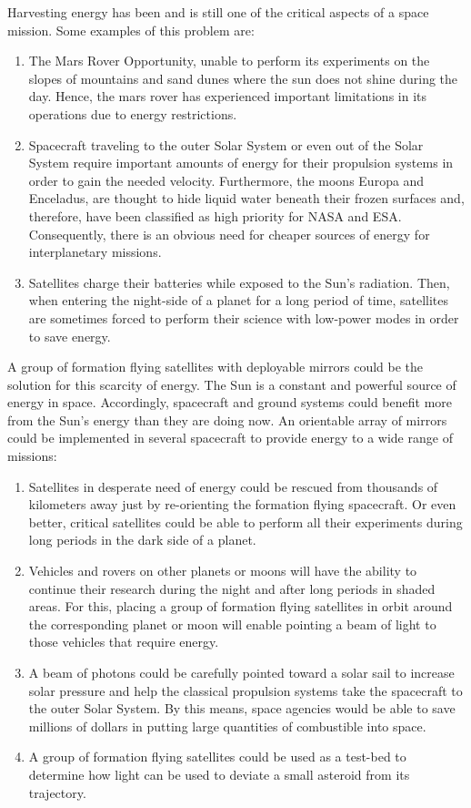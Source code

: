 Harvesting energy has been and is still one of the critical aspects
of a space mission. Some examples of this problem are: 
\begin{enumerate}
\item The Mars Rover Opportunity, unable to perform its experiments on the
slopes of mountains and sand dunes where the sun does not shine during
the day. Hence, the mars rover has experienced important limitations
in its operations due to energy restrictions.
\item Spacecraft traveling to the outer Solar System or even out of the
Solar System require important amounts of energy for their propulsion
systems in order to gain the needed velocity. Furthermore, the moons Europa and Enceladus, are thought
to hide liquid water beneath their frozen surfaces and, therefore, have
been classified as high priority for NASA and ESA. Consequently, there
is an obvious need for cheaper sources of energy for interplanetary
missions.
\item Satellites charge their batteries while exposed to the Sun's radiation.
Then, when entering the night-side of a planet for a long period
of time, satellites are sometimes forced to perform their science with low-power
modes in order to save energy.
\end{enumerate}
A group of formation flying satellites with deployable mirrors could
be the solution for this scarcity of energy. The Sun is a constant
and powerful source of energy in space. Accordingly, spacecraft and
ground systems could benefit more from the Sun's energy than they
are doing now. An orientable array of mirrors could be implemented
in several spacecraft to provide energy to a wide range of missions:
\begin{enumerate}
\item Satellites in desperate need of energy could be rescued from thousands
of kilometers away just by re-orienting the formation flying spacecraft.
Or even better, critical satellites could be able to perform all their
experiments during long periods in the dark side of a planet. 
\item Vehicles and rovers on other planets or moons will have the ability
to continue their research during the night and after long periods
in shaded areas. For this, placing a group of formation flying satellites
in orbit around the corresponding planet or moon will enable pointing
a beam of light to those vehicles that require energy.
\item A beam of photons could be carefully pointed toward a solar sail to
increase solar pressure and help the classical propulsion systems
take the spacecraft to the outer Solar System. By this means, space
agencies would be able to save millions of dollars in putting large
quantities of combustible into space.
\item A group of formation flying satellites could be used as a test-bed
to determine how light can be used to deviate a small asteroid from
its trajectory.
\end{enumerate}

